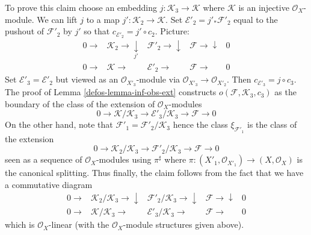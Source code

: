 \begin{remark}
\medskip\noindent
To prove this claim choose an embedding $j : \mathcal{K}_3 \to \mathcal{K}$
where $\mathcal{K}$ is an injective $\mathcal{O}_X$-module.
We can lift $j$ to a map $j' : \mathcal{K}_2 \to \mathcal{K}$.
Set $\mathcal{E}'_2 = j'_*\mathcal{F}'_2$ equal to the pushout
of $\mathcal{F}'_2$ by $j'$ so that $c_{\mathcal{E}'_2} = j' \circ c_2$.
Picture:
$$
\begin{array}{ccccc}0 \longrightarrow & \mathcal{K}_2 \longrightarrow\underset{j'}{\downarrow} & \mathcal{F}'_2 \longrightarrow\downarrow & \mathcal{F} \longrightarrow\downarrow & 0 \\ 0 \longrightarrow & \mathcal{K} \longrightarrow & \mathcal{E}'_2 \longrightarrow & \mathcal{F} \longrightarrow & 0\end{array}
$$
Set $\mathcal{E}'_3 = \mathcal{E}'_2$ but viewed as an
$\mathcal{O}_{X'_3}$-module via $\mathcal{O}_{X'_3} \to \mathcal{O}_{X'_2}$.
Then $c_{\mathcal{E}'_3} = j \circ c_3$.
The proof of Lemma \ref{defos-lemma-inf-obs-ext} constructs
$o(\mathcal{F}, \mathcal{K}_3, c_3)$
as the boundary of the class of the extension of $\mathcal{O}_X$-modules
$$
0 \to
\mathcal{K}/\mathcal{K}_3 \to
\mathcal{E}'_3/\mathcal{K}_3 \to
\mathcal{F} \to 0
$$
On the other hand, note that $\mathcal{F}'_1 = \mathcal{F}'_2/\mathcal{K}_3$
hence the class $\xi_{\mathcal{F}'_1}$ is the class
of the extension
$$
0 \to \mathcal{K}_2/\mathcal{K}_3 \to \mathcal{F}'_2/\mathcal{K}_3
\to \mathcal{F} \to 0
$$
seen as a sequence of $\mathcal{O}_X$-modules using $\pi^\sharp$
where $\pi : (X'_1, \mathcal{O}_{X'_1}) \to (X, \mathcal{O}_X)$
is the canonical splitting.
Thus finally, the claim follows from the fact that we have
a commutative diagram
$$
\begin{array}{ccccc}0 \longrightarrow & \mathcal{K}_2/\mathcal{K}_3 \longrightarrow\downarrow & \mathcal{F}'_2/\mathcal{K}_3 \longrightarrow\downarrow & \mathcal{F} \longrightarrow\downarrow & 0 \\ 0 \longrightarrow & \mathcal{K}/\mathcal{K}_3 \longrightarrow & \mathcal{E}'_3/\mathcal{K}_3 \longrightarrow & \mathcal{F} \longrightarrow & 0\end{array}
$$
which is $\mathcal{O}_X$-linear (with the $\mathcal{O}_X$-module
structures given above).
\end{remark}

